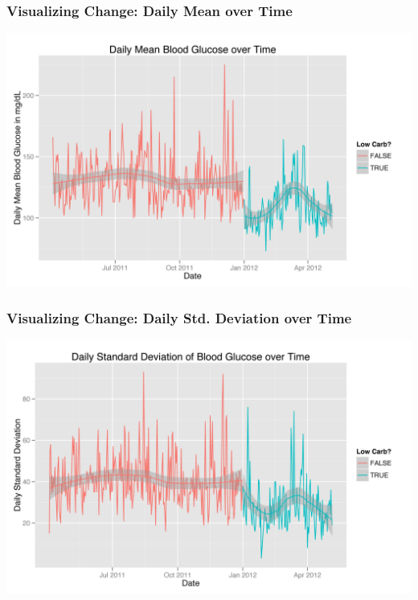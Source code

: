 \documentclass{beamer}
\begin{document}
\begin{frame}
  \frametitle{Visualizing Change: Daily Mean over Time}

  \begin{center}
    \includegraphics[width=\textwidth]{mean_blood_glucose.jpg}
  \end{center}

\end{frame}

\begin{frame}
  \frametitle{Visualizing Change: Daily Std. Deviation over Time}
  
  \begin{center}
    \includegraphics[width=\textwidth]{standard_deviation.jpg}
  \end{center}

\end{frame}
\end{document}
